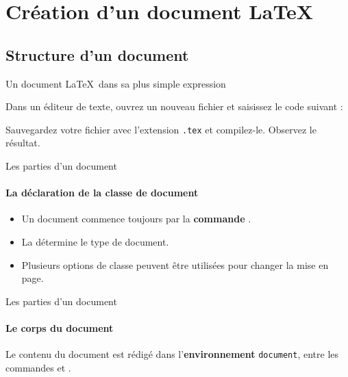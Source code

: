 
\section{Création d'un document \LaTeX}

\subsection{Structure d'un document}

\begin{frame}[c,fragile]{Un document \LaTeX\ dans sa plus simple expression}

	Dans un éditeur de texte, ouvrez un nouveau fichier et saisissez le code suivant :
	

	Sauvegardez votre fichier avec l'extension \texttt{.tex} et compilez-le. Observez le résultat.
	
\end{frame}

\begin{frame}[c,fragile]{Les parties d'un document}
	\framesubtitle{La déclaration de la classe de document}
	\begin{itemize}
		\item Un document commence toujours par la \textbf{commande} .
		

		\item La 
			détermine le type de document.		
		\item Plusieurs options de classe peuvent être utilisées pour changer la mise en page.
	\end{itemize}
\end{frame}

\begin{frame}[c,fragile]{Les parties d'un document}
	\framesubtitle{Le corps du document}
	Le contenu du document est rédigé dans l'\textbf{environnement} \texttt{document},
	entre les commandes  et .
\end{frame}

